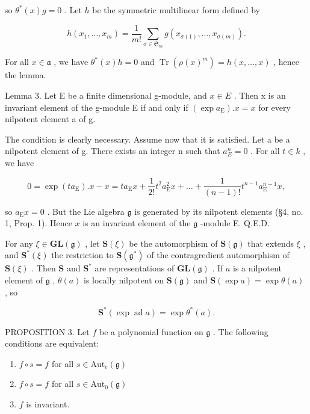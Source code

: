 so \(\theta^{*}(x)g = 0\) . Let \(h\) be the symmetric multilinear form defined by

\[
h (x _ {1}, \dots , x _ {m}) = \frac {1}{m !} \sum_ {\sigma \in \mathfrak {S} _ {m}} g (x _ {\sigma (1)}, \dots , x _ {\sigma (m)}).
\]

For all \(x \in \mathfrak{a}\) , we have \(\theta^{*}(x)h = 0\) and \(\operatorname{Tr}(\rho(x)^m) = h(x, \ldots, x)\) , hence the lemma.

Lemma 3. Let E be a finite dimensional g-module, and \(x \in E\) . Then x is an invariant element of the g-module E if and only if \((\exp a_{\mathrm{E}}).x = x\) for every nilpotent element a of g.

The condition is clearly necessary. Assume now that it is satisfied. Let a be a nilpotent element of g. There exists an integer n such that \(a_{E}^{n}=0\) . For all \(t\in k\) , we have

\[
0 = \exp (t a _ {\mathrm{E}}). x - x = t a _ {\mathrm{E}} x + \frac {1}{2 !} t ^ {2} a _ {\mathrm{E}} ^ {2} x + \dots + \frac {1}{(n - 1) !} t ^ {n - 1} a _ {\mathrm{E}} ^ {n - 1} x,
\]

so \(a_{\mathrm{E}}x = 0\) . But the Lie algebra \(\mathfrak{g}\) is generated by its nilpotent elements (§4, no. 1, Prop. 1). Hence \(x\) is an invariant element of the \(\mathfrak{g}\) -module E. Q.E.D.

For any \(\xi \in \mathbf{GL}(\mathfrak{g})\) , let \(\mathbf{S}(\xi)\) be the automorphism of \(\mathbf{S}(\mathfrak{g})\) that extends \(\xi\) , and \(\mathbf{S}^*(\xi)\) the restriction to \(\mathbf{S}(\mathfrak{g}^*)\) of the contragredient automorphism of \(\mathbf{S}(\xi)\) . Then \(\mathbf{S}\) and \(\mathbf{S}^*\) are representations of \(\mathbf{GL}(\mathfrak{g})\) . If \(a\) is a nilpotent element of \(\mathfrak{g}\) , \(\theta(a)\) is locally nilpotent on \(\mathbf{S}(\mathfrak{g})\) and \(\mathbf{S}(\exp a) = \exp \theta(a)\) , so

\[
\mathbf {S} ^ {*} (\exp \operatorname{ad} a) = \exp \theta^ {*} (a).\tag{2}
\]

PROPOSITION 3. Let \(f\) be a polynomial function on \(\mathfrak{g}\) . The following conditions are equivalent:

\begin{enumerate}
\def\labelenumi{(\roman{enumi})}
\item
  \(f\circ s = f\) for all \(s\in \mathrm{Aut}_e(\mathfrak{g})\)
\item
  \(f\circ s = f\) for all \(s\in \mathrm{Aut}_0(\mathfrak{g})\)
\item
  \(f\) is invariant.
\end{enumerate}


